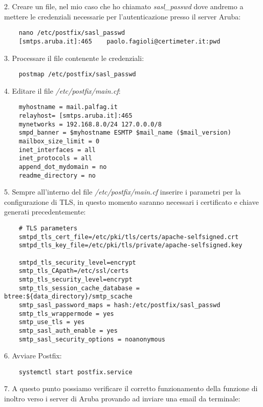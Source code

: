 2. Creare un file, nel mio caso che ho chiamato \textit{sasl\_passwd} dove andremo a mettere le credenziali
necessarie per l'autenticazione presso il server Aruba:

\begin{verbatim}
    nano /etc/postfix/sasl_passwd
    [smtps.aruba.it]:465    paolo.fagioli@certimeter.it:pwd
\end{verbatim}

3. Processare il file contenente le credenziali:

\begin{verbatim}
    postmap /etc/postfix/sasl_passwd
\end{verbatim}

4. Editare il file \textit{/etc/postfix/main.cf}:

\begin{verbatim}
    myhostname = mail.palfag.it
    relayhost= [smtps.aruba.it]:465
    mynetworks = 192.168.8.0/24 127.0.0.0/8
    smpd_banner = $myhostname ESMTP $mail_name ($mail_version)
    mailbox_size_limit = 0
    inet_interfaces = all
    inet_protocols = all
    append_dot_mydomain = no
    readme_directory = no
\end{verbatim}

5. Sempre all'interno del file \textit{/etc/postfix/main.cf} inserire i parametri per la configurazione di TLS,
in questo momento saranno necessari i certificato e chiave generati precedentemente:

\begin{verbatim}
    # TLS parameters
    smtpd_tls_cert_file=/etc/pki/tls/certs/apache-selfsigned.crt
    smtpd_tls_key_file=/etc/pki/tls/private/apache-selfsigned.key

    smtpd_tls_security_level=encrypt
    smtp_tls_CApath=/etc/ssl/certs
    smtp_tls_security_level=encrypt
    smtp_tls_session_cache_database = btree:${data_directory}/smtp_scache
    smtp_sasl_password_maps = hash:/etc/postfix/sasl_passwd
    smtp_tls_wrappermode = yes
    smtp_use_tls = yes
    smtp_sasl_auth_enable = yes
    smtp_sasl_security_options = noanonymous
\end{verbatim}

6. Avviare Postfix:
\begin{verbatim}
    systemctl start postfix.service
\end{verbatim}

7. A questo punto possiamo verificare il corretto funzionamento della funzione di inoltro verso i server di Aruba 
provando ad inviare una email da terminale:

